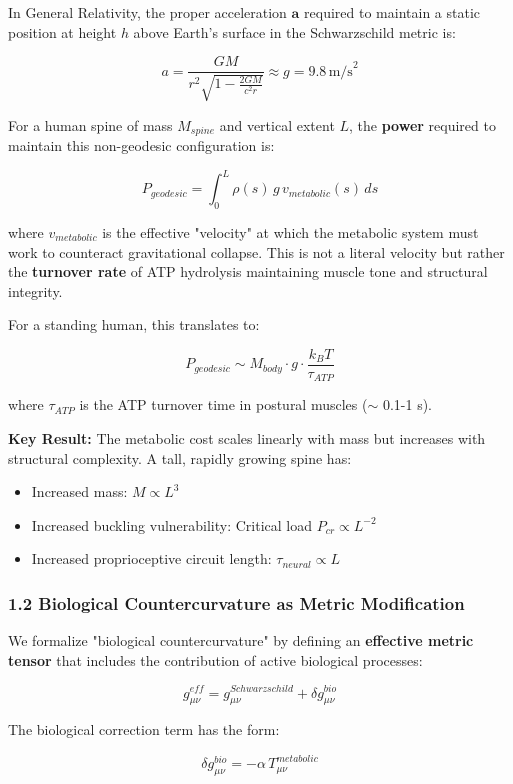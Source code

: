\documentclass[11pt,a4paper]{article}
\begin{document}
In General Relativity, the proper acceleration $\mathbf{a}$ required to maintain a static position at height $h$ above Earth's surface in the Schwarzschild metric is:

$$
a = \frac{GM}{r^2\sqrt{1-\frac{2GM}{c^2r}}} \approx g = 9.8 \, \text{m/s}^2
$$

For a human spine of mass $M_{spine}$ and vertical extent $L$, the \textbf{power} required to maintain this non-geodesic configuration is:

$$
P_{geodesic} = \int_0^L \rho(s) \, g \, v_{metabolic}(s) \, ds
$$

where $v_{metabolic}$ is the effective "velocity" at which the metabolic system must work to counteract gravitational collapse. This is not a literal velocity but rather the \textbf{turnover rate} of ATP hydrolysis maintaining muscle tone and structural integrity.

For a standing human, this translates to:

$$
P_{geodesic} \sim M_{body} \cdot g \cdot \frac{k_BT}{\tau_{ATP}}
$$

where $\tau_{ATP}$ is the ATP turnover time in postural muscles ($\sim$ 0.1-1 s).

\textbf{Key Result:} The metabolic cost scales linearly with mass but increases with structural complexity. A tall, rapidly growing spine has:

\begin{itemize}
\item Increased mass: $M \propto L^3$
\item Increased buckling vulnerability: Critical load $P_{cr} \propto L^{-2}$
\item Increased proprioceptive circuit length: $\tau_{neural} \propto L$
\end{itemize}

\subsubsection{1.2 Biological Countercurvature as Metric Modification}

We formalize "biological countercurvature" by defining an \textbf{effective metric tensor} that includes the contribution of active biological processes:

$$
g_{\mu\nu}^{eff} = g_{\mu\nu}^{Schwarzschild} + \delta g_{\mu\nu}^{bio}
$$

The biological correction term has the form:

$$
\delta g_{\mu\nu}^{bio} = -\alpha \, T_{\mu\nu}^{metabolic}
$$
\end{document}
